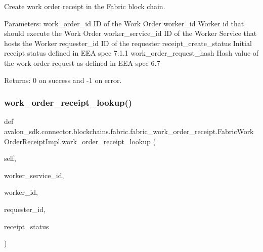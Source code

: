 \begin{DoxyVerb}Create work order receipt in the Fabric block chain.

Parameters:
work_order_id           ID of the Work Order
worker_id               Worker id that should execute the Work Order
worker_service_id       ID of the Worker Service that
                hosts the Worker
requester_id            ID of the requester
receipt_create_status   Initial receipt status defined
                in EEA spec 7.1.1
work_order_request_hash Hash value of the work order request as
                defined in EEA spec 6.7

Returns:
0 on success and -1 on error.
\end{DoxyVerb}
 \mbox{\label{classavalon__sdk_1_1connector_1_1blockchains_1_1fabric_1_1fabric__work__order__receipt_1_1FabricWorkOrderReceiptImpl_a98f17b6c621a9c8c591580104aa0b7c5}} 
\subsubsection{\texorpdfstring{work\+\_\+order\+\_\+receipt\+\_\+lookup()}{work\_order\_receipt\_lookup()}}
{\footnotesize\ttfamily def avalon\+\_\+sdk.\+connector.\+blockchains.\+fabric.\+fabric\+\_\+work\+\_\+order\+\_\+receipt.\+Fabric\+Work\+Order\+Receipt\+Impl.\+work\+\_\+order\+\_\+receipt\+\_\+lookup (\begin{DoxyParamCaption}\item[{}]{self,  }\item[{}]{worker\+\_\+service\+\_\+id,  }\item[{}]{worker\+\_\+id,  }\item[{}]{requester\+\_\+id,  }\item[{}]{receipt\+\_\+status }\end{DoxyParamCaption})}

